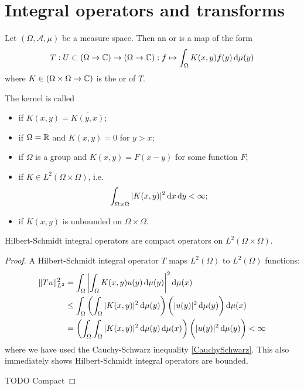 \section{Integral operators and transforms}
\begin{definition}
Let $(\Omega, \mathcal{A}, \mu)$ be a measure space. Then an  or  is a map of the form
\[ T: U\subset (\Omega\to\mathbb{C}) \to (\Omega\to\mathbb{C}): f \mapsto \int_\Omega K(x,y)f(y) \operatorname{d \!}{\mu(y)} \]
where $K\in (\Omega\times \Omega \to \mathbb{C})$ is the  or  of $T$.

The kernel is called
\begin{itemize}
\item {} if $K(x,y) = \overline{K(y,x)}$;
\item {} if $\Omega = \mathbb{R}$ and $K(x,y) = 0$ for $y>x$;
\item {} if $\Omega$ is a group and $K(x,y) = F(x-y)$ for some function $F$;
\item {} if $K\in L^2(\Omega\times \Omega)$, i.e.\
\[ \int_{\Omega\times \Omega}|K(x,y)|^2\operatorname{d \!}{x}\operatorname{d \!}{y} < \infty; \]
\item \udef{singular} if $K(x,y)$ is unbounded on $\Omega\times \Omega$.
\end{itemize}
\end{definition}

\begin{lemma}
Hilbert-Schmidt integral operators are compact operators on $L^2(\Omega\times \Omega)$.
\end{lemma}
\begin{proof}
A Hilbert-Schmidt integral operator $T$ maps $L^2(\Omega)$ to $L^2(\Omega)$ functions:
\begin{align*}
\norm{Tu}^2_{L^2} &= \int_\Omega \left|\int_{\Omega} K(x,y)u(y)\diff{\mu(y)}\right|^2\diff{\mu(x)} \\
&\leq \int_\Omega \left(\int_{\Omega} |K(x,y)|^2\diff{\mu(y)}\right) \bigg( |u(y)|^2\diff{\mu(y)}\bigg)\diff{\mu(x)} \\
&= \left(\int_\Omega \int_{\Omega} |K(x,y)|^2\diff{\mu(y)}\diff{\mu(x)}\right) \bigg( |u(y)|^2\diff{\mu(y)}\bigg) < \infty
\end{align*}
where we have used the Cauchy-Schwarz inequality \ref{CauchySchwarz}. This also immediately shows Hilbert-Schmidt integral operators are bounded.

TODO Compact
\end{proof}

